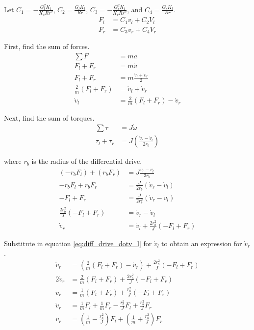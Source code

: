 Let $C_1 = -\frac{G_l^2 K_t}{K_v R r^2}$, $C_2 = \frac{G_l K_t}{Rr}$,
$C_3 = -\frac{G_r^2 K_t}{K_v R r^2}$, and $C_4 = \frac{G_r K_t}{Rr}$.
\begin{align}
  F_l &= C_1 v_l + C_2 V_l \\
  F_r &= C_3 v_r + C_4 V_r
\end{align}

First, find the sum of forces.
\begin{align}
  \sum F &= ma \nonumber \\
  F_l + F_r &= m \dot{v} \nonumber \\
  F_l + F_r &= m \frac{\dot{v}_l + \dot{v}_r}{2} \nonumber \\
  \frac{2}{m} (F_l + F_r) &= \dot{v}_l + \dot{v}_r \nonumber \\
  \dot{v}_l &= \frac{2}{m} (F_l + F_r) - \dot{v}_r \label{eq:diff_drive_dotv_l}
\end{align}

Next, find the sum of torques.
\begin{align*}
  \sum \tau &= J \dot{\omega} \\
  \tau_l + \tau_r &= J \left(\frac{\dot{v}_r - \dot{v}_l}{2 r_b}\right)
\end{align*}

where $r_b$ is the radius of the differential drive.
\begin{align*}
  (-r_b F_l) + (r_b F_r) &= J \frac{\dot{v}_r - \dot{v}_l}{2 r_b} \\
  -r_b F_l + r_b F_r &= \frac{J}{2 r_b} (\dot{v}_r - \dot{v}_l) \\
  -F_l + F_r &= \frac{J}{2 r_b^2} (\dot{v}_r - \dot{v}_l) \\
  \frac{2 r_b^2}{J} (-F_l + F_r) &= \dot{v}_r - \dot{v}_l \\
  \dot{v}_r &= \dot{v}_l + \frac{2 r_b^2}{J} (-F_l + F_r)
\end{align*}

Substitute in equation \eqref{eq:diff_drive_dotv_l} for $\dot{v}_l$ to obtain an
expression for $\dot{v}_r$.
\begin{align}
  \dot{v}_r &= \left(\frac{2}{m} (F_l + F_r) - \dot{v}_r\right) +
    \frac{2 r_b^2}{J} (-F_l + F_r) \nonumber \\
  2\dot{v}_r &= \frac{2}{m} (F_l + F_r) + \frac{2 r_b^2}{J} (-F_l + F_r)
    \nonumber \\
  \dot{v}_r &= \frac{1}{m} (F_l + F_r) + \frac{r_b^2}{J} (-F_l + F_r)
    \label{eq:diff_drive_vr_2mid} \\
  \dot{v}_r &= \frac{1}{m} F_l + \frac{1}{m} F_r - \frac{r_b^2}{J} F_l +
    \frac{r_b^2}{J} F_r \nonumber \\
  \dot{v}_r &= \left(\frac{1}{m} - \frac{r_b^2}{J}\right) F_l +
    \left(\frac{1}{m} + \frac{r_b^2}{J}\right) F_r \label{eq:diff_drive_vr_2}
\end{align}

